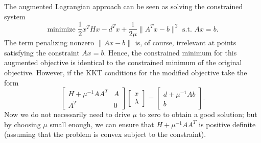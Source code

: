 \documentclass[12pt, leqno]{article} %
\begin{document}
The augmented Lagrangian approach can be seen as solving the
constrained system
\[
  \mbox{minimize } \frac{1}{2} x^T H x - d^T x + \frac{1}{2\mu} \|A^T x-b\|^2
  \mbox{ s.t. } Ax = b.
\]
The term penalizing nonzero $\|Ax-b\|$ is, of course, irrelevant at
points satisfying the constraint $Ax = b$.  Hence, the constrained
minimum for this augmented objective is identical to the constrained
minimum of the original objective.  However, if the KKT conditions for
the modified objective take the form
\[
  \begin{bmatrix}
    H+\mu^{-1}AA^T & A \\
    A^T & 0
  \end{bmatrix}
  \begin{bmatrix} x \\ \lambda \end{bmatrix} =
  \begin{bmatrix} d + \mu^{-1} A b \\ b \end{bmatrix}.
\]
Now we do not necessarily need to drive $\mu$ to zero to obtain a good
solution; but by choosing $\mu$ small enough, we can ensure that
$H + \mu^{-1} AA^T$ is positive definite (assuming that the problem is
convex subject to the constraint).
\end{document}
